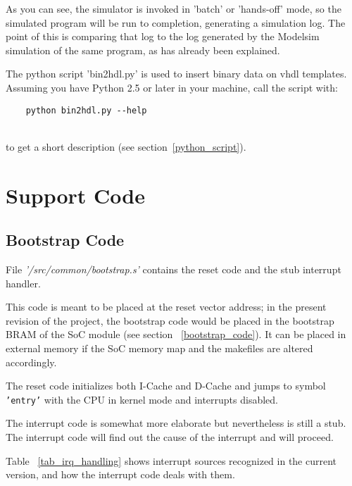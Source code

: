     As you can see, the simulator is invoked in 'batch' or 'hands-off' mode, so
    the simulated program will be run to completion, generating a simulation 
    log. The point of this is comparing that log to the log generated by the 
    Modelsim simulation of the same program, as has already been explained.

    The python script 'bin2hdl.py' is used to insert binary data on vhdl 
    templates. 
    Assuming you have Python 2.5 or later in your machine, call the script with:

    \begin{verbatim}
    python bin2hdl.py --help
    \end{verbatim}\\

    to get a short description (see section~\ref{python_script}).
    
\section{Support Code}
\label{support_code}

\subsection{Bootstrap Code}
\label{asm_bootstrap_code}

    File \emph{'/src/common/bootstrap.s'} contains the reset code and the stub
    interrupt handler.
    
    This code is meant to be placed at the reset vector address; in the present
    revision of the project, the bootstrap code would be placed in the 
    bootstrap BRAM of the SoC module (see section ~\ref{bootstrap_code}). It 
    can be placed in external memory if the SoC memory map and the makefiles are 
    altered accordingly.
    
    The reset code initializes both I-Cache and D-Cache and jumps to symbol
    \texttt{'entry'} with the CPU in kernel mode and interrupts disabled.

    
    The interrupt code is somewhat more elaborate but nevertheless is still 
    a stub. The interrupt code will find out the cause of the interrupt and will
    proceed.
    
    Table ~\ref{tab_irq_handling} shows interrupt sources recognized in the 
    current version, and how the interrupt code deals with them.
    
